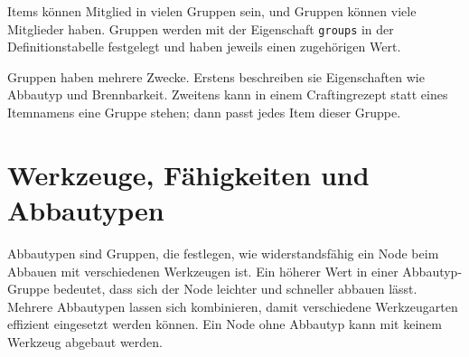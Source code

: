 Items können Mitglied in vielen Gruppen sein, und
Gruppen können viele Mitglieder haben. Gruppen werden mit der
Eigenschaft \texttt{groups} in der Definitionstabelle festgelegt und
haben jeweils einen zugehörigen Wert.

\begin{Shaded}
\begin{Highlighting}[]
 \OperatorTok{=} \OperatorTok{\{}  \OperatorTok{=} \OperatorTok{,}  \OperatorTok{=}  \OperatorTok{\}}
\end{Highlighting}
\end{Shaded}

Gruppen haben mehrere Zwecke. Erstens beschreiben sie Eigenschaften wie
Abbautyp und Brennbarkeit. Zweitens kann in
einem Craftingrezept statt eines Itemnamens eine Gruppe stehen; dann
passt jedes Item dieser Gruppe.

\begin{Shaded}
\begin{Highlighting}[]
\OperatorTok{(\{}
     \OperatorTok{=} \OperatorTok{,}
     \OperatorTok{=} \OperatorTok{,}
     \OperatorTok{=} \OperatorTok{\{} \OperatorTok{,}  \OperatorTok{\},}
\OperatorTok{\})}
\end{Highlighting}
\end{Shaded}

\section{Werkzeuge, Fähigkeiten und
Abbautypen}\label{werkzeuge-fuxe4higkeiten-und-abbautypen}

Abbautypen sind Gruppen, die festlegen, wie widerstandsfähig ein Node
beim Abbauen mit verschiedenen Werkzeugen ist. Ein höherer Wert in einer
Abbautyp-Gruppe bedeutet, dass sich der Node leichter und schneller
abbauen lässt. Mehrere Abbautypen lassen sich kombinieren, damit
verschiedene Werkzeugarten effizient eingesetzt werden können. Ein Node
ohne Abbautyp kann mit keinem Werkzeug abgebaut werden.

